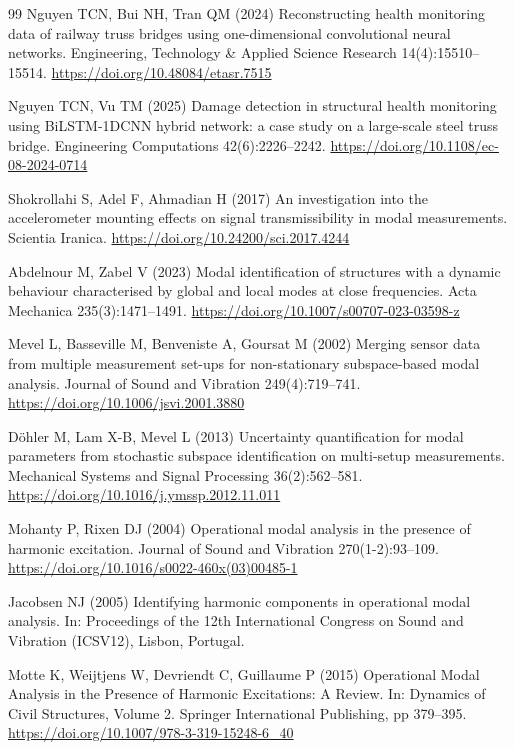 \documentclass[11pt]{article}
\begin{document}
\begin{thebibliography}{99}
Nguyen TCN, Bui NH, Tran QM (2024) Reconstructing health monitoring data of railway truss bridges using one-dimensional convolutional neural networks. Engineering, Technology \& Applied Science Research 14(4):15510--15514. \url{https://doi.org/10.48084/etasr.7515}

Nguyen TCN, Vu TM (2025) Damage detection in structural health monitoring using BiLSTM-1DCNN hybrid network: a case study on a large-scale steel truss bridge. Engineering Computations 42(6):2226--2242. \url{https://doi.org/10.1108/ec-08-2024-0714}

Shokrollahi S, Adel F, Ahmadian H (2017) An investigation into the accelerometer mounting effects on signal transmissibility in modal measurements. Scientia Iranica. \url{https://doi.org/10.24200/sci.2017.4244}

Abdelnour M, Zabel V (2023) Modal identification of structures with a dynamic behaviour characterised by global and local modes at close frequencies. Acta Mechanica 235(3):1471--1491. \url{https://doi.org/10.1007/s00707-023-03598-z}

Mevel L, Basseville M, Benveniste A, Goursat M (2002) Merging sensor data from multiple measurement set-ups for non-stationary subspace-based modal analysis. Journal of Sound and Vibration 249(4):719--741. \url{https://doi.org/10.1006/jsvi.2001.3880}

D{\"o}hler M, Lam X-B, Mevel L (2013) Uncertainty quantification for modal parameters from stochastic subspace identification on multi-setup measurements. Mechanical Systems and Signal Processing 36(2):562--581. \url{https://doi.org/10.1016/j.ymssp.2012.11.011}

Mohanty P, Rixen DJ (2004) Operational modal analysis in the presence of harmonic excitation. Journal of Sound and Vibration 270(1-2):93--109. \url{https://doi.org/10.1016/s0022-460x(03)00485-1}

Jacobsen NJ (2005) Identifying harmonic components in operational modal analysis. In: Proceedings of the 12th International Congress on Sound and Vibration (ICSV12), Lisbon, Portugal.

Motte K, Weijtjens W, Devriendt C, Guillaume P (2015) Operational Modal Analysis in the Presence of Harmonic Excitations: A Review. In: Dynamics of Civil Structures, Volume 2. Springer International Publishing, pp 379--395. \url{https://doi.org/10.1007/978-3-319-15248-6_40}


\end{thebibliography}
\end{document}

